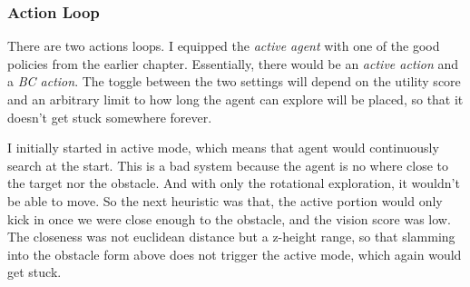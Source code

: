 \subsubsection{Action Loop}
There are two actions loops. I equipped the \emph{active agent} with one of the good policies from the earlier chapter. Essentially, there would be an \emph{active action} and a \emph{BC action}. The toggle between the two settings will depend on the utility score and an arbitrary limit to how long the agent can explore will be placed, so that it doesn't get stuck somewhere forever.

I initially started in active mode, which means that agent would continuously search at the start. This is a bad system because the agent is no where close to the target nor the obstacle. And with only the rotational exploration, it wouldn't be able to move. So the next heuristic was that, the active portion would only kick in once we were close enough to the obstacle, and the vision score was low. The closeness was not euclidean distance but a z-height range, so that slamming into the obstacle form above does not trigger the active mode, which again would get stuck.
  